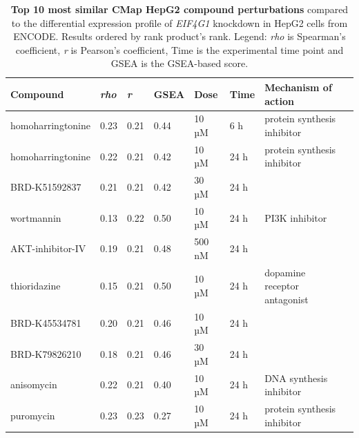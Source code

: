 \begin{table}[!h]
\centering
\footnotesize
\caption[Top 10 CMap HepG2 compound perturbations]{\textbf{Top 10 most similar CMap HepG2 compound perturbations} compared to the differential expression profile of \emph{EIF4G1} knockdown in HepG2 cells from ENCODE. Results ordered by rank product's rank. Legend: \emph{rho} is Spearman's coefficient, \emph{r} is Pearson's coefficient, Time is the experimental time point and GSEA is the GSEA-based score.}
\label{tab:eif4g1-cmap-compounds}
\begin{tabular}{llllllll}
\toprule
\textbf{Compound}     & \textbf{\emph{rho}} & \textbf{\emph{r}} & \textbf{GSEA} & \textbf{Dose} & \textbf{Time} & \textbf{Mechanism of action} \\
\midrule
homoharringtonine & 0.23                           & 0.21                           & 0.44          & 10 µM         & 6 h                & protein synthesis inhibitor  \\
homoharringtonine & 0.22                           & 0.21                           & 0.42          & 10 µM         & 24 h               & protein synthesis inhibitor  \\
BRD-K51592837     & 0.21                           & 0.21                           & 0.42          & 30 µM         & 24 h               &                              \\
wortmannin        & 0.13                           & 0.22                           & 0.50          & 10 µM         & 24 h               & PI3K inhibitor               \\
AKT-inhibitor-IV  & 0.19                           & 0.21                           & 0.48          & 500 nM        & 24 h               &                              \\
thioridazine      & 0.15                           & 0.21                           & 0.50          & 10 µM         & 24 h               & dopamine receptor antagonist \\
BRD-K45534781     & 0.20                           & 0.21                           & 0.46          & 10 µM         & 24 h               &                              \\
BRD-K79826210     & 0.18                           & 0.21                           & 0.46          & 30 µM         & 24 h               &                              \\
anisomycin        & 0.22                           & 0.21                           & 0.40          & 10 µM         & 24 h               & DNA synthesis inhibitor      \\
puromycin         & 0.23                           & 0.23                           & 0.27          & 10 µM         & 24 h               & protein synthesis inhibitor \\
\bottomrule
\end{tabular}
\end{table}

